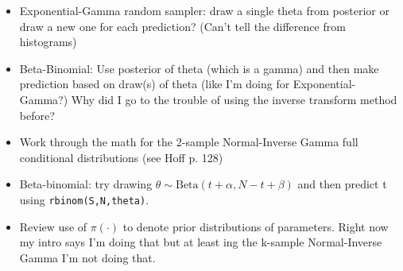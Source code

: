 \documentclass[12pt, a4paper]{article}
\begin{document}
\begin{itemize}
  \item Exponential-Gamma random sampler:  draw a single theta from posterior or draw a new one for each prediction?  (Can't tell the difference from histograms)
  \item Beta-Binomial:  Use posterior of theta (which is a gamma) and then make prediction based on draw(s) of theta (like I'm doing for Exponential-Gamma?)  Why did I go to the trouble of using the inverse transform method before?
  \item Work through the math for the 2-sample Normal-Inverse Gamma full conditional distributions (see Hoff p. 128)
  \item Beta-binomial:  try drawing $\theta\sim\text{Beta}(t+\alpha,N-t+\beta)$ and then predict t using \texttt{rbinom(S,N,theta)}.
  \item Review use of $\pi(\cdot)$ to denote prior distributions of parameters.  Right now my intro says I'm doing that but at least ing the k-sample Normal-Inverse Gamma I'm not doing that.
\end{itemize}
\end{document}
